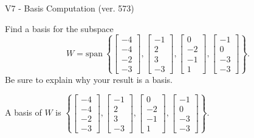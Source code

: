 \begin{exercise}
  \begin{exerciseTitle}V7 - Basis Computation (ver. 573)\end{exerciseTitle}
  \begin{exerciseStatement}
    Find a basis for the subspace 
\[W=\mathrm{span}\ \left\{\left[\begin{array}{r}
-4 \\
-4 \\
-2 \\
-3
\end{array}\right] , \left[\begin{array}{r}
-1 \\
2 \\
3 \\
-3
\end{array}\right] , \left[\begin{array}{r}
0 \\
-2 \\
-1 \\
1
\end{array}\right] , \left[\begin{array}{r}
-1 \\
0 \\
-3 \\
-3
\end{array}\right]\right\}.\]
 Be sure to explain why your result is a basis.


  \end{exerciseStatement}
  \begin{exerciseAnswer}
   A basis of \(W\) is  \(\left\{\left[\begin{array}{r}
-4 \\
-4 \\
-2 \\
-3
\end{array}\right] , \left[\begin{array}{r}
-1 \\
2 \\
3 \\
-3
\end{array}\right] , \left[\begin{array}{r}
0 \\
-2 \\
-1 \\
1
\end{array}\right] , \left[\begin{array}{r}
-1 \\
0 \\
-3 \\
-3
\end{array}\right]\right\}\).
  


  \end{exerciseAnswer}
\end{exercise}
